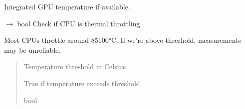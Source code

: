 \documentclass[letterpaper,10pt,english]{sphinxmanual}
\begin{document}
\begin{fulllineitems}
\begin{fulllineitems}
\end{fulllineitems}


\begin{fulllineitems}
\label{\detokenize{core.models.energy_measurement:core.models.energy_measurement.ThermalReadings.gpu_temperature_celsius}}
\pysigstartsignatures
\pysigline
{}
\pysigstopsignatures
\sphinxAtStartPar
Integrated GPU temperature if available.

\end{fulllineitems}


\begin{fulllineitems}
\label{\detokenize{core.models.energy_measurement:core.models.energy_measurement.ThermalReadings.is_throttling}}
\pysigstartsignatures
\pysiglinewithargsret
{}
{}
{{ $\rightarrow$ bool}}
\pysigstopsignatures
\sphinxAtStartPar
Check if CPU is thermal throttling.

\sphinxAtStartPar
Most CPUs throttle around 85\sphinxhyphen{}100°C. If we’re above threshold,
measurements may be unreliable.
\begin{quote}\begin{description}
\sphinxAtStartPar
{} \textendash{} Temperature threshold in Celsius

\sphinxAtStartPar
True if temperature exceeds threshold

\sphinxAtStartPar
bool

\end{description}\end{quote}

\end{fulllineitems}


\end{fulllineitems}
\end{document}

